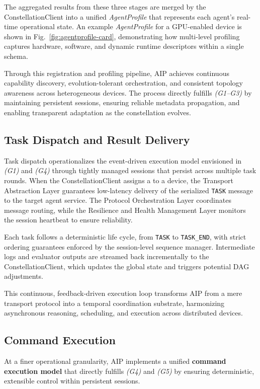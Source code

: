 The aggregated results from these three stages are merged by the ConstellationClient into a unified \textit{AgentProfile} that represents each agent's real-time operational state. An example \textit{AgentProfile} for a GPU-enabled device is shown in Fig.~\ref{fig:agentprofile-card}, demonstrating how multi-level profiling captures hardware, software, and dynamic runtime descriptors within a single schema.

Through this registration and profiling pipeline, AIP achieves continuous capability discovery, evolution-tolerant orchestration, and consistent topology awareness across heterogeneous devices. The process directly fulfills \textit{(G1–G3)} by maintaining persistent sessions, ensuring reliable metadata propagation, and enabling transparent adaptation as the constellation evolves.

\subsection{Task Dispatch and Result Delivery}
\label{subsec:aip-dispatch}
Task dispatch operationalizes the event-driven execution model envisioned in \textit{(G1)} and \textit{(G4)} through tightly managed sessions that persist across multiple task rounds. When the ConstellationClient assigns a \TaskStar to a device, the Transport Abstraction Layer guarantees low-latency delivery of the serialized \texttt{TASK} message to the target agent service. The Protocol Orchestration Layer coordinates message routing, while the Resilience and Health Management Layer monitors the session heartbeat to ensure reliability.

Each task follows a deterministic life cycle, from \texttt{TASK} to \texttt{TASK\_END}, with strict ordering guarantees enforced by the session-level sequence manager. Intermediate logs and evaluator outputs are streamed back incrementally to the ConstellationClient, which updates the global \TaskConstellation state and triggers potential DAG adjustments.

This continuous, feedback-driven execution loop transforms AIP from a mere transport protocol into a temporal coordination substrate, harmonizing asynchronous reasoning, scheduling, and execution across distributed devices.

\subsection{Command Execution}
\label{subsec:aip-commands}
At a finer operational granularity, AIP implements a unified \textbf{command execution model} that directly fulfills \textit{(G4)} and \textit{(G5)} by ensuring deterministic, extensible control within persistent sessions.

